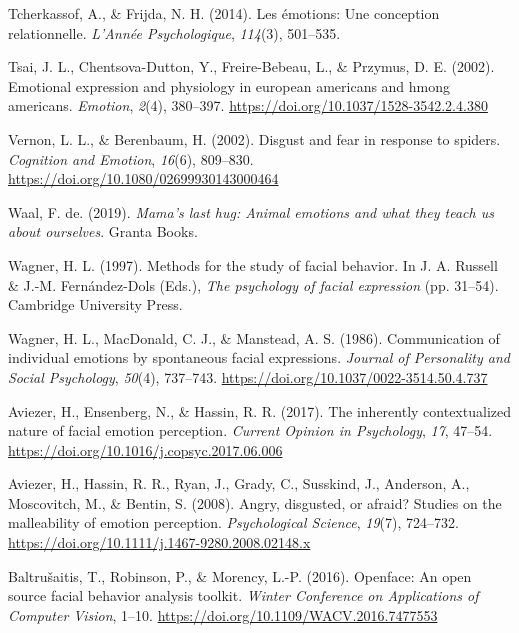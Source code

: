 \documentclass[
  english,
  doc]{apa7}
\newlength{\cslhangindent}
\newenvironment{cslreferences}%
  {\setlength{\parindent}{0pt}%
  \everypar{\setlength{\hangindent}{\cslhangindent}}\ignorespaces}%
  {\par}
\begin{document}
\begin{cslreferences}
\leavevmode\hypertarget{ref-tcherkassof2014emotions}{}%
Tcherkassof, A., \& Frijda, N. H. (2014). Les émotions: Une conception relationnelle. \emph{L'Année Psychologique}, \emph{114}(3), 501--535.

\leavevmode\hypertarget{ref-tsai2002emotional}{}%
Tsai, J. L., Chentsova-Dutton, Y., Freire-Bebeau, L., \& Przymus, D. E. (2002). Emotional expression and physiology in european americans and hmong americans. \emph{Emotion}, \emph{2}(4), 380--397. \url{https://doi.org/10.1037/1528-3542.2.4.380}

\leavevmode\hypertarget{ref-vernon2002disgust}{}%
Vernon, L. L., \& Berenbaum, H. (2002). Disgust and fear in response to spiders. \emph{Cognition and Emotion}, \emph{16}(6), 809--830. \url{https://doi.org/10.1080/02699930143000464}

\leavevmode\hypertarget{ref-de2019mama}{}%
Waal, F. de. (2019). \emph{Mama's last hug: Animal emotions and what they teach us about ourselves}. Granta Books.

\leavevmode\hypertarget{ref-wagner1997methods}{}%
Wagner, H. L. (1997). Methods for the study of facial behavior. In J. A. Russell \& J.-M. Fernández-Dols (Eds.), \emph{The psychology of facial expression} (pp. 31--54). Cambridge University Press.

\leavevmode\hypertarget{ref-wagner1986communication}{}%
Wagner, H. L., MacDonald, C. J., \& Manstead, A. S. (1986). Communication of individual emotions by spontaneous facial expressions. \emph{Journal of Personality and Social Psychology}, \emph{50}(4), 737--743. \url{https://doi.org/10.1037/0022-3514.50.4.737}

\leavevmode\hypertarget{ref-aviezer2017inherently}{}%
Aviezer, H., Ensenberg, N., \& Hassin, R. R. (2017). The inherently contextualized nature of facial emotion perception. \emph{Current Opinion in Psychology}, \emph{17}, 47--54. \url{https://doi.org/10.1016/j.copsyc.2017.06.006}

\leavevmode\hypertarget{ref-aviezer2008angry}{}%
Aviezer, H., Hassin, R. R., Ryan, J., Grady, C., Susskind, J., Anderson, A., Moscovitch, M., \& Bentin, S. (2008). Angry, disgusted, or afraid? Studies on the malleability of emotion perception. \emph{Psychological Science}, \emph{19}(7), 724--732. \url{https://doi.org/10.1111/j.1467-9280.2008.02148.x}

\leavevmode\hypertarget{ref-baltruvsaitis2016openface}{}%
Baltrušaitis, T., Robinson, P., \& Morency, L.-P. (2016). Openface: An open source facial behavior analysis toolkit. \emph{Winter Conference on Applications of Computer Vision}, 1--10. \url{https://doi.org/10.1109/WACV.2016.7477553}


\end{cslreferences}
\end{document}
